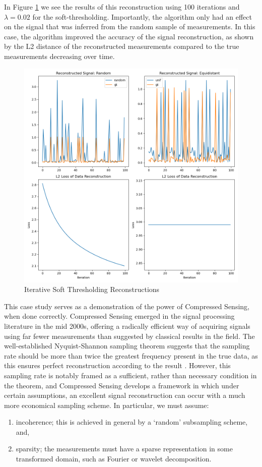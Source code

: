 \documentclass[12pt]{article}
\begin{document}
In Figure \ref{fig:signal_reconstruct} we see the results of this reconstruction using 100 iterations and $\lambda=0.02$ for the soft-thresholding.
Importantly, the algorithm only had an effect on the signal that was inferred from the random sample of measurements.
In this case, the algorithm improved the accuracy of the signal reconstruction,
as shown by the L2 distance of the reconstructed measurements compared to the true measurements decreasing over time.

\begin{figure}[htp]
    \includegraphics[scale=0.5]{figures/signal_reconstruct.png}
    \caption{Iterative Soft Thresholding Reconstructions}
    \label{fig:signal_reconstruct}
\end{figure}

This case study serves as a demonstration of the power of Compressed Sensing,
when done correctly.
Compressed Sensing emerged in the signal processing literature in the mid 2000s,
offering a radically efficient way of acquiring signals using far fewer measurements than suggested by classical results in the field.
The well-established Nyquist-Shannon sampling theorem suggests that the sampling rate should be more than twice the greatest frequency present in the true data,
as this ensures perfect reconstruction according to the result \cite{shannon}.
However, this sampling rate is notably framed as a sufficient, rather than necessary condition in the theorem,
and Compressed Sensing develops a framework in which under certain assumptions,
an excellent signal reconstruction can occur with a much more economical sampling scheme.
In particular, we must assume:
\begin{enumerate}
    \item incoherence; this is achieved in general by a `random' subsampling scheme, and,
    \item sparsity; the measurements must have a sparse representation in some transformed domain, such as Fourier or wavelet decomposition.
\end{enumerate}
\end{document}
